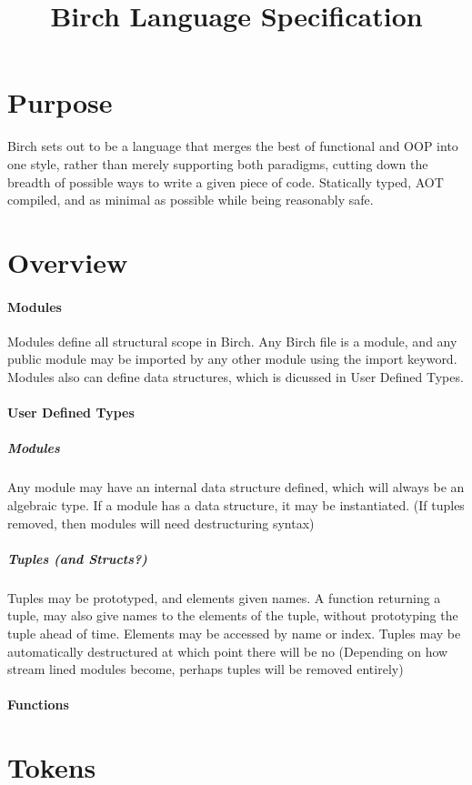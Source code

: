 \documentclass{article}
\title{Birch Language Specification}
\begin{document}
	\maketitle
	\newpage
	\section{Purpose}
		Birch sets out to be a language that merges the best of functional and OOP into one style,
		rather than merely supporting both paradigms,
		cutting down the breadth of possible ways to write a given piece of code.
		Statically typed, AOT compiled, and as minimal as possible while being reasonably safe.
	\section{Overview}
		\paragraph{Modules}
			Modules define all structural scope in Birch. 
			Any Birch file is a module, and any public module may be imported by any other module using the import keyword.
			Modules also can define data structures, which is dicussed in User Defined Types.
		\paragraph{User Defined Types}
			\subparagraph{Modules}
				Any module may have an internal data structure defined, which will always be an algebraic type.
				If a module has a data structure, it may be instantiated.
				(If tuples removed, then modules will need destructuring syntax)
			\subparagraph{Tuples (and Structs?)}
				Tuples may be prototyped, and elements given names. 
				A function returning a tuple, may also give names to the elements of the tuple, without prototyping the tuple ahead of time.
				Elements may be accessed by name or index.
				Tuples may be automatically destructured at which point there will be no
				(Depending on how stream lined modules become, perhaps tuples will be removed entirely)
		\paragraph{Functions}
	\section{Tokens}
		\subsection{}
\end{document}
